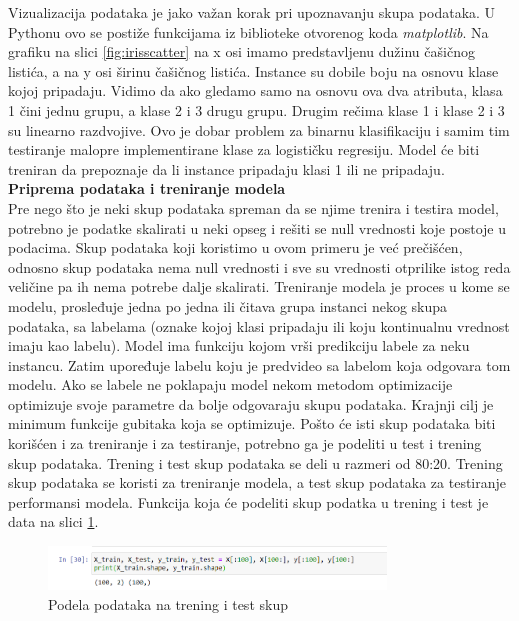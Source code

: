 \documentclass[a4paper,12pt]{report}
\begin{document}
Vizualizacija podataka je jako važan korak pri upoznavanju skupa podataka. U Pythonu ovo se postiže funkcijama iz biblioteke otvorenog koda \textit{matplotlib}. Na grafiku na slici \ref{fig:irisscatter} na x osi imamo predstavljenu dužinu čašičnog listića, a na y osi širinu čašičnog listića. Instance su dobile boju na osnovu klase kojoj pripadaju. Vidimo da ako gledamo samo na osnovu ova dva atributa, klasa 1 čini jednu grupu, a klase 2 i 3 drugu grupu. Drugim rečima klase 1 i klase 2 i 3 su linearno razdvojive. Ovo je dobar problem za binarnu klasifikaciju i samim tim testiranje malopre implementirane klase za logističku regresiju. Model će biti treniran da prepoznaje da li instance pripadaju klasi 1 ili ne pripadaju. \\

\textbf{Priprema podataka i treniranje modela}\\

Pre nego što je neki skup podataka spreman da se njime trenira i testira model, potrebno je podatke skalirati u neki opseg i rešiti se null vrednosti koje postoje u podacima. Skup podataka koji koristimo u ovom primeru je već prečišćen, odnosno skup podataka nema null vrednosti i sve su vrednosti otprilike istog reda veličine pa ih nema potrebe dalje skalirati. Treniranje modela je proces u kome se modelu, prosleđuje jedna po jedna ili čitava grupa instanci nekog skupa podataka, sa labelama (oznake kojoj klasi pripadaju ili koju kontinualnu vrednost imaju kao labelu). Model ima funkciju kojom vrši predikciju labele za neku instancu. Zatim upoređuje labelu koju je predvideo sa labelom koja odgovara tom modelu. Ako se labele ne poklapaju model nekom metodom optimizacije optimizuje svoje parametre da bolje odgovaraju skupu podataka. Krajnji cilj je minimum funkcije gubitaka koja se optimizuje. Pošto će isti skup podataka biti korišćen i za treniranje i za testiranje, potrebno ga je podeliti u test i trening skup podataka. Trening i test skup podataka se deli u razmeri od 80:20. Trening skup podataka se koristi za treniranje modela, a test skup podataka za testiranje performansi modela. Funkcija koja će podeliti skup podatka u trening i test je data na slici \ref{fig:irissplit}.

\begin{figure}[h]
    \centering
    \includegraphics[width=0.8\textwidth]{iris_split_dataset.png}
    \caption{Podela podataka na trening i test skup}\label{fig:irissplit}
\end{figure}
\end{document}
